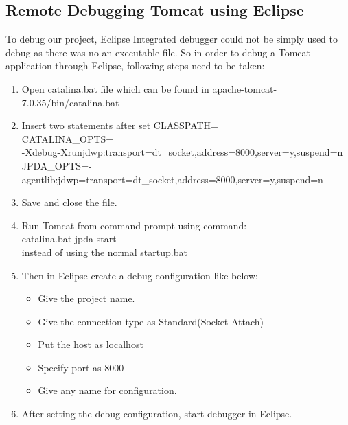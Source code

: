 \documentclass[12pt]{article}
\begin{document}
\subsection{Remote Debugging Tomcat using Eclipse}
To debug our project, Eclipse Integrated debugger could not be simply used to debug as there was no an executable file. So in order to debug a Tomcat application through Eclipse, following steps need to be taken:
\begin{enumerate}
    \item Open catalina.bat file which can be found in \textgravedbl apache-tomcat-7.0.35/bin/catalina.bat\textasciidieresis
\item Insert two statements after \textgravedbl set CLASSPATH=\textasciidieresis \\
CATALINA\_OPTS=\\
\textgravedbl-Xdebug-Xrunjdwp:transport=dt\_socket,address=8000,server=y,suspend=n\textacutedbl\\
JPDA\_OPTS=\textgravedbl -agentlib:jdwp=transport=dt\_socket,address=8000,server=y,suspend=n\textasciidieresis
\item Save and close the file. 
\item Run Tomcat from command prompt using command: \\
catalina.bat jpda start \\
instead of using the normal startup.bat
\item Then in Eclipse create a debug configuration like below:

\begin{itemize}
    \item Give the project name.
\item Give the connection type as Standard(Socket Attach)
\item Put the host as localhost
\item Specify port as 8000
\item Give any name for configuration.
\end{itemize}

\item After setting the debug configuration, start debugger in Eclipse.
\end{enumerate}
  
\end{document}
